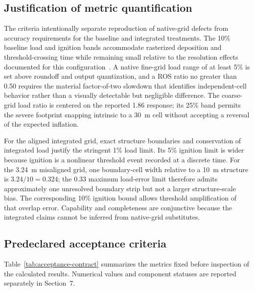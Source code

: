 \subsection{Justification of metric quantification}

The criteria intentionally separate reproduction of native-grid defects from
accuracy requirements for the baseline and integrated treatments.  The 10\%
baseline load and ignition bands accommodate rasterized deposition and
threshold-crossing time while remaining small relative to the resolution
effects documented for this configuration~\cite{Qin2025}.  A native fine-grid
load range of at least 5\% is set above roundoff and output quantization, and a
ROS ratio no greater than 0.50 requires the material factor-of-two slowdown
that identifies independent-cell behavior rather than a visually detectable
but negligible difference.  The coarse-grid load ratio is centered on the
reported 1.86 response; its 25\% band permits the severe footprint snapping
intrinsic to a \SI{30}{m} cell without accepting a reversal of the expected
inflation.

For the aligned integrated grid, exact structure boundaries and conservation
of integrated load justify the stringent 1\% load limit.  Its 5\% ignition
limit is wider because ignition is a nonlinear threshold event recorded at a
discrete time.  For the \SI{3.24}{m} misaligned grid, one boundary-cell width
relative to a \SI{10}{m} structure is \(3.24/10=0.324\); the 0.33 maximum
load-error limit therefore admits approximately one unresolved boundary strip
but not a larger structure-scale bias.  The corresponding 10\% ignition bound
allows threshold amplification of that overlap error.  Capability and
completeness are conjunctive because the integrated claims cannot be inferred
from native-grid substitutes.

\subsection{Predeclared acceptance criteria}

Table~\ref{tab:acceptance-contract} summarizes the metrics fixed before
inspection of the calculated results. Numerical values and component statuses
are reported separately in Section~7.


